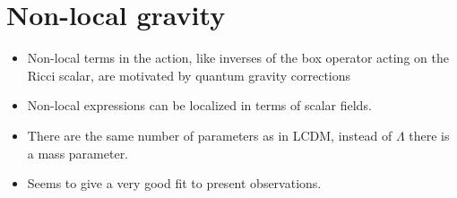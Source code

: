 \section{Non-local gravity}
\begin{itemize}
\item Non-local terms in the action, like inverses of the box operator acting
on the Ricci scalar, are motivated by quantum gravity corrections
\item Non-local expressions can be localized in terms of scalar fields.
\item There are the same number of parameters as in LCDM, instead of $\Lambda$
there is a mass parameter.
\item Seems to give a very good fit to present observations.
\end{itemize}